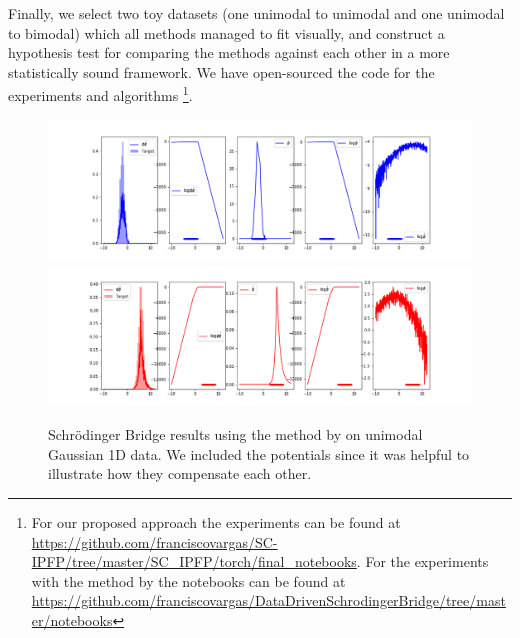 \documentclass[a4paper,12pt,twoside,openright]{report}
\theoremstyle{definition}
\begin{document}
Finally, we select two toy datasets (one unimodal to unimodal and one unimodal to bimodal) which all methods managed to fit visually, and construct a hypothesis test for comparing the methods against each other in a more statistically sound framework.  We have open-sourced the code for the experiments and algorithms \footnote{For our proposed approach the experiments can be found at \url{https://github.com/franciscovargas/SC-IPFP/tree/master/SC_IPFP/torch/final_notebooks}. For the experiments with the method by \cite{pavon2018data} the notebooks can be found at \url{https://github.com/franciscovargas/DataDrivenSchrodingerBridge/tree/master/notebooks}}.
\begin{figure}[t]
    \centering
    \includegraphics[scale=0.4,trim={2.3cm 0.2cm 1.5cm 0}, clip]{images/Pavon/Forward_unimodal_working_pavon_relu_nn500.png}\\\vspace{-0.2cm}
    \includegraphics[scale=0.4,trim={2.3cm 0 1.5cm 1.5cm}, clip]{images/Pavon/Backward_unimodal_working_pavon_relu_nn500.png} 
    \caption{Schrödinger Bridge results using the method by \cite{pavon2018data} on unimodal Gaussian 1D data. We included the potentials since it was helpful to illustrate how they compensate each other. }
    \label{fig:driftpavon}
\end{figure}
\end{document}
